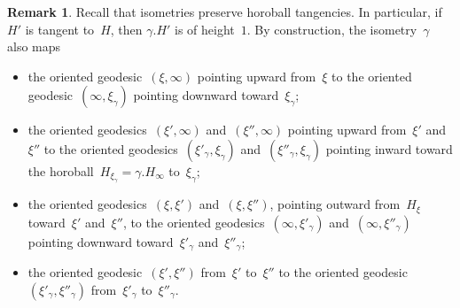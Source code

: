 \documentclass[11pt,reqno]{amsart}
\theoremstyle{definition}
\newtheorem{remark}[theorem]{Remark}
\numberwithin{equation}{section}
\numberwithin{equation}{section}
\begin{document}
\begin{remark} \label{rem:updown}
Recall that isometries preserve horoball tangencies.
In particular, if $H'$ is tangent to~$H$, then $\gamma.H'$ is of height~$1$.
By construction, the isometry~$\gamma$ also maps
\begin{itemize}
\item the oriented geodesic~$(\xi,\infty)$ pointing upward from~$\xi$ to the oriented geodesic~$(\infty,\xi_\gamma)$ pointing downward toward~$\xi_\gamma$;
\item the oriented geodesics~$(\xi',\infty)$ and~$(\xi'',\infty)$ pointing upward from~$\xi'$ and~$\xi''$ to the oriented geodesics~$(\xi'_\gamma,\xi_\gamma)$ and~$(\xi''_\gamma,\xi_\gamma)$ pointing inward toward the horoball~$H_{\xi_\gamma}=\gamma.H_\infty$ to~$\xi_\gamma$;
\item the oriented geodesics~$(\xi,\xi')$ and~$(\xi,\xi'')$, pointing outward from~$H_\xi$ toward~$\xi'$ and~$\xi''$, to the oriented geodesics~$(\infty,\xi'_\gamma)$ and~$(\infty,\xi''_\gamma)$ pointing downward toward~$\xi'_\gamma$ and~$\xi''_\gamma$;
\item the oriented geodesic~$(\xi',\xi'')$ from~$\xi'$ to~$\xi''$ to the oriented geodesic~$(\xi'_\gamma,\xi''_\gamma)$ from~$\xi'_\gamma$ to~$\xi''_\gamma$.
\end{itemize}
\end{remark}
\end{document}
